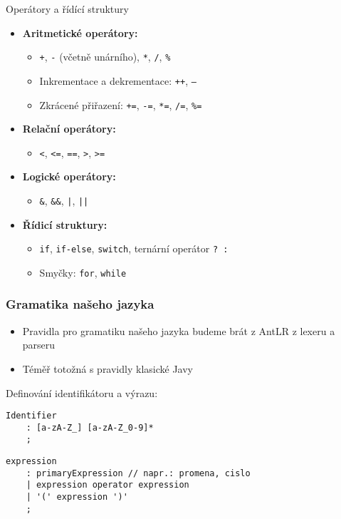 \documentclass[11pt]{beamer}
\begin{document}
\begin{frame}{Operátory a řídící struktury}
\begin{itemize}
        \item \textbf{Aritmetické operátory:}
        \begin{itemize}
            \item \texttt{+}, \texttt{-} (včetně unárního), \texttt{*}, \texttt{/}, \texttt{\%}
            \item Inkrementace a dekrementace: \texttt{++}, \texttt{--}
            \item Zkrácené přiřazení: \texttt{+=}, \texttt{-=}, \texttt{*=}, \texttt{/=}, \texttt{\%=}
        \end{itemize}
        \item \textbf{Relační operátory:}
        \begin{itemize}
            \item \texttt{<}, \texttt{<=}, \texttt{==}, \texttt{>}, \texttt{>=}
        \end{itemize}
        \item \textbf{Logické operátory:}
        \begin{itemize}
            \item \texttt{\&}, \texttt{\&\&}, \texttt{|}, \texttt{||}
        \end{itemize}
        \item \textbf{Řídicí struktury:}
        \begin{itemize}
            \item \texttt{if}, \texttt{if-else}, \texttt{switch}, ternární operátor \texttt{? :}
            \item Smyčky: \texttt{for}, \texttt{while}
        \end{itemize}
    \end{itemize}
\end{frame}
\begin{frame}[fragile]
\frametitle{Gramatika našeho jazyka}
\begin{itemize}
	\item Pravidla pro gramatiku našeho jazyka budeme brát z AntLR z lexeru a parseru
	\item Téměř totožná s pravidly klasické Javy
\end{itemize}
\vspace{.5cm}
Definování identifikátoru a výrazu:
\begin{lstlisting}
Identifier
    : [a-zA-Z_] [a-zA-Z_0-9]*
    ;
\end{lstlisting}
\begin{lstlisting}
expression
    : primaryExpression // napr.: promena, cislo
    | expression operator expression 
    | '(' expression ')'    
    ;
\end{lstlisting}
\end{frame}
\end{document}
